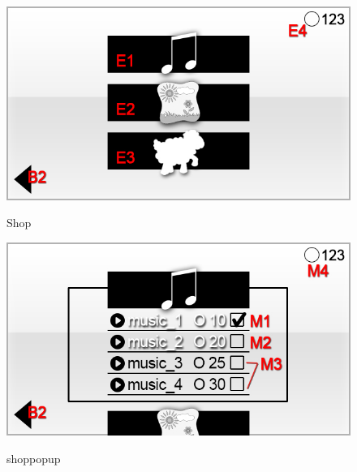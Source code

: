 \begin{figure}[H]
\label{fig:shop}
\centering
\includegraphics[scale=0.55]{../GUI-Entwurf/_jpeg_numeration/shop.jpg}
\caption{Shop}
\end{figure}

\begin{figure}[H]
\label{fig:shop_popup}
\centering
\includegraphics[scale=0.55]{../GUI-Entwurf/_jpeg_numeration/shop_popup.jpg}
\caption{shoppopup}
\end{figure}

